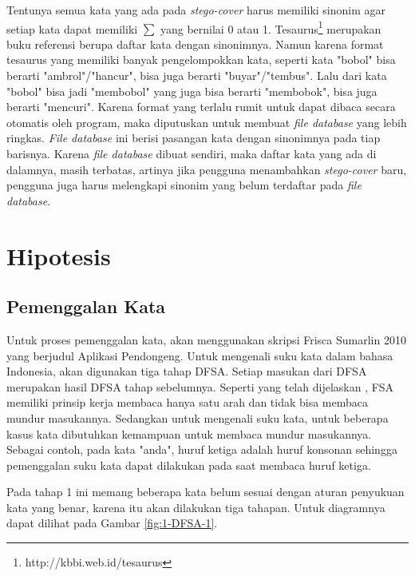 Tentunya semua kata yang ada pada \textit{stego-cover} harus memiliki sinonim agar setiap kata dapat memiliki $\sum$ yang bernilai 0 atau 1. Tesaurus\footnote{http://kbbi.web.id/tesaurus} merupakan buku referensi berupa daftar kata dengan sinonimnya. Namun karena format tesaurus yang memiliki banyak pengelompokkan kata, seperti kata "bobol" bisa berarti "ambrol"/"hancur", bisa juga berarti "buyar"/"tembus". Lalu dari kata "bobol" bisa jadi "membobol" yang juga bisa berarti "membobok", bisa juga berarti "mencuri". Karena format yang terlalu rumit untuk dapat dibaca secara otomatis oleh program, maka diputuskan untuk membuat \textit{file database} yang lebih ringkas. \textit{File database} ini berisi pasangan kata dengan sinonimnya pada tiap barisnya. Karena \textit{file database} dibuat sendiri, maka daftar kata yang ada di dalamnya, masih terbatas, artinya jika pengguna menambahkan \textit{stego-cover} baru, pengguna juga harus melengkapi sinonim yang belum terdaftar pada \textit{file database}.

\section{Hipotesis}

\subsection{Pemenggalan Kata}
Untuk proses pemenggalan kata, akan menggunakan skripsi Frisca Sumarlin 2010 yang berjudul Aplikasi Pendongeng. Untuk mengenali suku kata dalam bahasa Indonesia, akan digunakan tiga tahap DFSA. Setiap masukan dari DFSA merupakan hasil DFSA tahap sebelumnya. Seperti yang telah dijelaskan , FSA memiliki prinsip kerja membaca hanya satu arah dan tidak bisa membaca mundur masukannya. Sedangkan untuk mengenali suku kata, untuk beberapa kasus kata dibutuhkan kemampuan untuk membaca mundur masukannya. Sebagai contoh, pada kata "anda", huruf ketiga adalah huruf konsonan sehingga pemenggalan suku kata dapat dilakukan pada saat membaca huruf ketiga.

Pada tahap 1 ini memang beberapa kata belum sesuai dengan aturan penyukuan kata yang benar, karena itu akan dilakukan tiga tahapan. Untuk diagramnya dapat dilihat pada Gambar \ref{fig:1-DFSA-1}.


